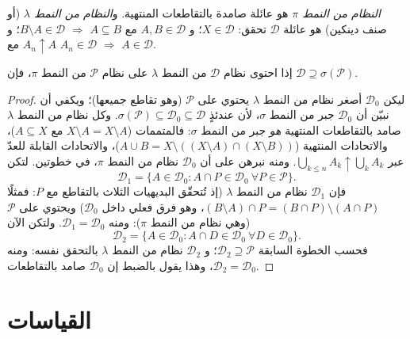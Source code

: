 \begin{definition}\label{def:b3:measure:dynkin}
\emph{النظام من النمط $\pi$} هو عائلة
صامدة بالتقاطعات المنتهية. و\emph{النظام من النمط
$\lambda$} (أو صنف دينكين) هو
عائلة $\mathcal D$ تحقق: $X \in \mathcal
D$؛ و $A, B \in \mathcal D$ مع $A \subseteq B$
$\Rightarrow$ $B
\setminus A \in \mathcal D$؛ و $A_n \uparrow A$ مع $A_n \in
\mathcal D$ $\Rightarrow$
$A \in \mathcal D$.
\end{definition}

\begin{theorem}
\label{thm:b3:measure:dynkin}
إذا احتوى نظام $\mathcal D$ من النمط $\lambda$ على نظام
$\mathcal P$ من النمط $\pi$، فإن $\mathcal D \supseteq
\sigma(\mathcal P)$.
\end{theorem}

\begin{proof}
ليكن $\mathcal D_0$ أصغر نظام من النمط $\lambda$ يحتوي على
$\mathcal P$ (وهو تقاطع جميعها)؛ ويكفي أن نبيّن أن
$\mathcal D_0$ جبر من النمط $\sigma$، لأن عندئذٍ $\sigma(\mathcal P) \subseteq \mathcal D_0 \subseteq \mathcal
D$. وكل
نظام من النمط $\lambda$ صامد بالتقاطعات المنتهية \emph{هو} جبر
من النمط $\sigma$: فالمتممات ($X \setminus A = X
\setminus A$ مع $A \subseteq X$)،
والاتحادات المنتهية ($A \cup B =
X \setminus ((X\setminus A)\cap(X\setminus B))$)، والاتحادات القابلة للعدّ عبر $\bigcup_{k \leq n}A_k \uparrow \bigcup_kA_k$.
ومنه نبرهن على أن $\mathcal D_0$ نظام من النمط $\pi$، في
خطوتين. لتكن
\[
\mathcal D_1 = \{A \in \mathcal D_0 : A \cap P \in \mathcal
D_0 \ \forall P \in \mathcal P\}.
\]
فإن $\mathcal D_1$ نظام من النمط $\lambda$ (إذ تُتحقّق البديهيات
الثلاث بالتقاطع مع $P$: فمثلًا $(B\setminus A)\cap P
= (B \cap P)\setminus(A \cap P)$، وهو فرق فعلي داخل
$\mathcal D_0$) ويحتوي على $\mathcal P$ (وهي نظام من النمط
$\pi$): ومنه $\mathcal D_1 = \mathcal D_0$. ولتكن الآن
\[
\mathcal D_2 = \{A \in \mathcal D_0 : A \cap D \in \mathcal
D_0\ \forall D \in \mathcal D_0\}.
\]
فحسب الخطوة السابقة $\mathcal D_2 \supseteq \mathcal P$؛ و $\mathcal D_2$ نظام من النمط
$\lambda$ بالتحقق نفسه: ومنه $\mathcal D_2 = \mathcal D_0$، وهذا يقول بالضبط إن
$\mathcal D_0$ صامد بالتقاطعات.
\end{proof}

\section{القياسات}

